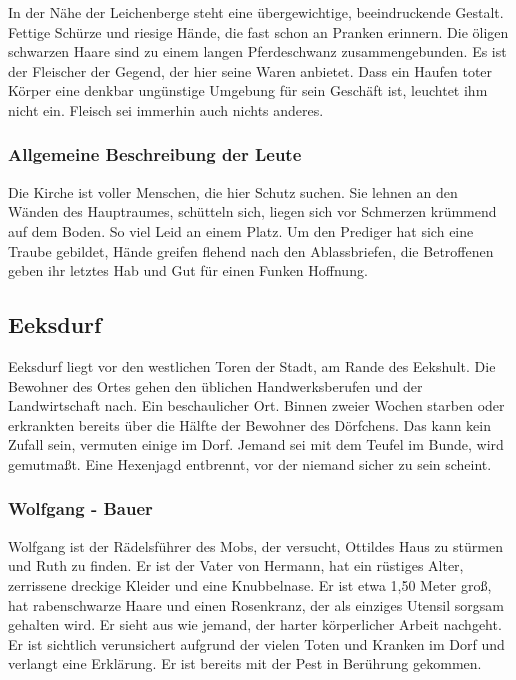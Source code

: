 In der Nähe der Leichenberge steht eine übergewichtige, beeindruckende Gestalt. Fettige Schürze und riesige Hände, die fast schon an Pranken erinnern. Die öligen schwarzen Haare sind zu einem langen Pferdeschwanz zusammengebunden. Es ist der Fleischer der Gegend, der hier seine Waren anbietet. Dass ein Haufen toter Körper eine denkbar ungünstige Umgebung für sein Geschäft ist, leuchtet ihm nicht ein. Fleisch sei immerhin auch nichts anderes.

\subsubsection*{Allgemeine Beschreibung der Leute}
\label{Leute}

Die Kirche ist voller Menschen, die hier Schutz suchen. Sie lehnen an den Wänden des Hauptraumes, schütteln sich, liegen sich vor Schmerzen krümmend auf dem Boden. So viel Leid an einem Platz. Um den Prediger hat sich eine Traube gebildet, Hände greifen flehend nach den Ablassbriefen, die Betroffenen geben ihr letztes Hab und Gut für einen Funken Hoffnung.


\subsection{Eeksdurf}

Eeksdurf liegt vor den westlichen Toren der Stadt, am Rande des Eekshult. Die Bewohner des Ortes gehen den üblichen Handwerksberufen und der Landwirtschaft nach. Ein beschaulicher Ort. Binnen zweier Wochen starben oder erkrankten bereits über die Hälfte der Bewohner des Dörfchens. Das kann kein Zufall sein, vermuten einige im Dorf. Jemand sei mit dem Teufel im Bunde, wird gemutmaßt. Eine Hexenjagd entbrennt, vor der niemand sicher zu sein scheint.

\subsubsection*{Wolfgang - Bauer}
\label{Wolfgang}

Wolfgang ist der Rädelsführer des Mobs, der versucht, Ottildes Haus zu stürmen und Ruth zu finden. Er ist der Vater von Hermann, hat ein rüstiges Alter, zerrissene dreckige Kleider und eine Knubbelnase. Er ist etwa 1,50 Meter groß, hat rabenschwarze Haare und einen Rosenkranz, der als einziges Utensil sorgsam gehalten wird. Er sieht aus wie jemand, der harter körperlicher Arbeit nachgeht. Er ist sichtlich verunsichert aufgrund der vielen Toten und Kranken im Dorf und verlangt eine Erklärung. Er ist bereits mit der Pest in Berührung gekommen.

